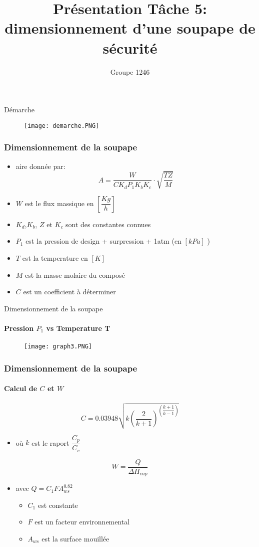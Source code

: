 \documentclass{beamer}
\title{Présentation Tâche 5:\\ dimensionnement d'une soupape de sécurité}
\author{Groupe 1246}
\institute{École Polytechnique de Louvain}
\date{}
\begin{document}
\begin{frame}
\titlepage
\end{frame}

\begin{frame}{Démarche}
\begin{figure}[ht!]
\centering
\texttt{[image: demarche.PNG]}
\end{figure}
\end{frame}

\begin{frame}
\frametitle{Dimensionnement de la soupape}
\begin{itemize}
\item aire donnée par:$$A=\dfrac{W}{CK_dP_1K_bK_c}\cdot \sqrt{\dfrac{TZ}{M}}$$
\item $W$ est le flux massique en $\left[ \dfrac{Kg}{h}\right] $
\item $K_d$,$K_b$, $Z$ et $K_c$ sont des constantes connues
\item $P_1$ est la pression de design  + surpression + 1atm (en $\left[ kPa \right]$ )
\item $T$ est la temperature en $[K]$
\item $M$ est la masse molaire du composé
\item $C$ est un coefficient à déterminer
\end{itemize}
\end{frame}

\begin{frame}{Dimensionnement de la soupape}
\framesubtitle{Pression $P_1$ vs Temperature T}
\begin{figure}[ht!]
\centering
\texttt{[image: graph3.PNG]}
\end{figure}
\end{frame}

\begin{frame}
\frametitle{Dimensionnement de la soupape}
\framesubtitle{Calcul de $C$ et $W$}
$$C=0.03948\sqrt{k\left( \dfrac{2}{k+1}\right)^{\left( \dfrac{k+1}{k-1}\right)}}$$
\begin{itemize}
\item où $k$ est le raport $\dfrac{C_p}{C_v}$
\end{itemize}
$$W=\dfrac{Q}{\Delta H_{vap}}$$
\begin{itemize}
\item avec $Q=C_1FA_{ws}^{0.82}$
\begin{itemize}
\item $C_1$ est constante
\item $F$ est un facteur environnemental
\item $A_{ws}$ est la surface mouillée
\end{itemize}
\end{itemize}
\end{frame}
\end{document}
